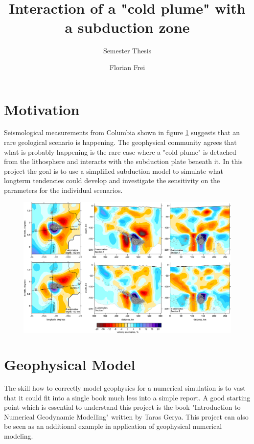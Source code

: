 \documentclass[12pt]{scrartcl}
\begin{document}
\title{Interaction of a "cold plume" with a subduction zone}
\subtitle{Semester Thesis}
\author{Florian Frei}

\maketitle

\newpage

\tableofcontents

\newpage

\section{Motivation}
Seismological measurements from Columbia shown in figure \ref{fig:seism_data} suggests that an rare geological scenario is happening. The geophysical community agrees that what is probably happening is the rare case where a "cold plume" is detached from the lithosphere and interacts with the subduction plate beneath it. In this project the goal is to use a simplified subduction model to simulate what longterm tendencies could develop and investigate the sensitivity on the parameters for the individual scenarios.
\begin{figure}
\includegraphics[scale=0.45]{deep_anomaly_hor_ver.png}
\label{fig:seism_data}
\end{figure}

\section{Geophysical Model}
The skill how to correctly model geophysics for a numerical simulation is to vast that it could fit into a single book much less into a simple report. A good starting point which is essential to understand this project is the book "Introduction to Numerical Geodynamic Modelling" \cite{gerya2009introduction} written by Taras Gerya. This project can also be seen as an additional example in application of geophysical numerical modeling.
\end{document}
